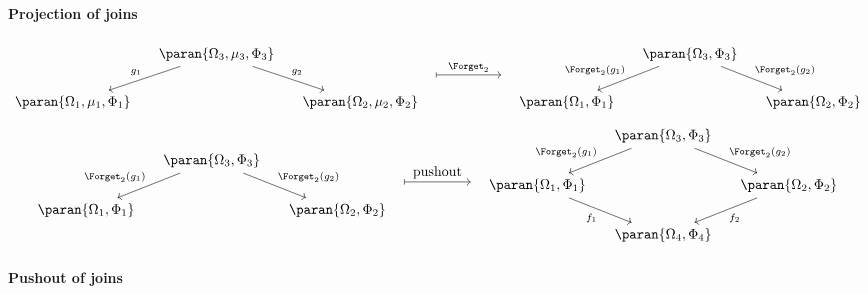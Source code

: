 \documentclass[12pt,oneside,pb-diagram]{article}
\begin{document}

\paragraph{Projection of joins}

%
\[\begin{tikzcd} [column sep = small]
	& \paran{ \Omega_3, \mu_3, \Phi_3 } \arrow[dr, "g_2"] \arrow[dl, "g_1"'] \\
	\paran{ \Omega_1, \mu_1, \Phi_1 } && \paran{ \Omega_2, \mu_2, \Phi_2 }
\end{tikzcd}
\begin{tikzcd} {} \arrow[rr, mapsto, "\Forget_2"] && {} \end{tikzcd} 
\begin{tikzcd} [column sep = small]
	& \paran{ \Omega_3, \Phi_3 } \arrow[dr, "\Forget_2(g_2)"] \arrow[dl, "\Forget_2(g_1)"'] \\
	\paran{ \Omega_1, \Phi_1 } && \paran{ \Omega_2, \Phi_2 }
\end{tikzcd}\]
%
%
\[\begin{tikzcd} [column sep = small]
	& \paran{ \Omega_3, \Phi_3 } \arrow[dr, "\Forget_2(g_2)"] \arrow[dl, "\Forget_2(g_1)"'] \\
	\paran{ \Omega_1, \Phi_1 } && \paran{ \Omega_2, \Phi_2 }
\end{tikzcd}
\begin{tikzcd} {} \arrow[rr, mapsto, "\mbox{pushout}"] && {} \end{tikzcd} 
\begin{tikzcd} [column sep = small]
	& \paran{ \Omega_3, \Phi_3 } \arrow[dr, "\Forget_2(g_2)"] \arrow[dl, "\Forget_2(g_1)"'] \\
	\paran{ \Omega_1, \Phi_1 } \arrow[dr, "f_1"'] && \paran{ \Omega_2, \Phi_2 } \arrow[dl, "f_2"] \\
	& \paran{ \Omega_4, \Phi_4 } 
\end{tikzcd}\]
%

\paragraph{Pushout of joins}
\end{document}
